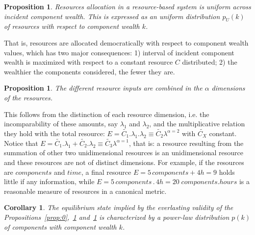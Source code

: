 \documentclass[a4paper, 11pt]{article} %
\newtheorem{proposition}[theorem]{Proposition}
\newtheorem{corollary}[theorem2]{Corollary}
\begin{document}
\begin{proposition}\label{prop:2}
	Resources allocation in a resource-based system is uniform across
	incident component wealth. 
	This is expressed as an uniform distribution $p_U(k)$ 
	of resources with respect to component wealth $k$.
\end{proposition}

That is, resources are allocated democratically with respect to component wealth values, which has two major consequences: 1) interval of incident component wealth is maximized with respect to a constant resource $C$ distributed; 
2) the wealthier the components considered, the fewer they are. 

\begin{proposition}\label{prop:1}
	The different resource inputs are combined in the $\alpha$ dimensions of the resources.
\end{proposition}



%

This follows from the distinction of each resource dimension,
i.e. the incomparability of these amounts,
say $\lambda_1$ and $\lambda_2$,
and the multiplicative relation they hold with the total resource: $E=\widetilde{C_1} . \lambda_1 . \lambda_2 \equiv \widetilde{C_2}\lambda^{\alpha=2}$
with $\widetilde{C_X}$ constant.
Notice that $E=\widetilde{C_1} . \lambda_1 + \widetilde{C_2}.\lambda_2 \equiv \widetilde{C_3}\lambda^{\alpha=1}$, that is: a resource resulting from the summation of other two unidimensional resources is an unidimensional resource and these resources are not of distinct dimensions.
For example, if the resources are $components$ and $time$,
a final resource $E=5\, components + 4h=9$
holds little if any information, while
$E= 5\, components \, . \, 4 h= 20\; components . hours$ is
a reasonable measure of resources in a canonical metric.

\begin{corollary}\label{prop:3}
	The equilibrium state implied by the everlasting validity of the Propositions~\ref{prop:0},~\ref{prop:2} and~\ref{prop:1} is characterized by
	a power-law distribution $p(k)$ of components with component wealth $k$.
\end{corollary}
\end{document}
